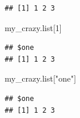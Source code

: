\documentclass[]{article}
\newenvironment{Shaded}{\begin{snugshade}}{\end{snugshade}}
\newcommand{\DecValTok}[1]{\textcolor[rgb]{0.00,0.00,0.81}{#1}}
\newcommand{\StringTok}[1]{\textcolor[rgb]{0.31,0.60,0.02}{#1}}
\newcommand{\CommentTok}[1]{\textcolor[rgb]{0.56,0.35,0.01}{\textit{#1}}}
\newcommand{\OperatorTok}[1]{\textcolor[rgb]{0.81,0.36,0.00}{\textbf{#1}}}
\newcommand{\NormalTok}[1]{#1}
\begin{document}
\begin{Shaded}
\end{Shaded}

\begin{verbatim}
## [1] 1 2 3
\end{verbatim}

\begin{Shaded}
\begin{Highlighting}[]
\NormalTok{my_crazy.list[}\DecValTok{1}\NormalTok{]}
\end{Highlighting}
\end{Shaded}

\begin{verbatim}
## $one
## [1] 1 2 3
\end{verbatim}

\begin{Shaded}
\begin{Highlighting}[]
\NormalTok{my_crazy.list[}\StringTok{"one"}\NormalTok{]}
\end{Highlighting}
\end{Shaded}

\begin{verbatim}
## $one
## [1] 1 2 3
\end{verbatim}

\begin{Shaded}
\end{Shaded}
\end{document}
